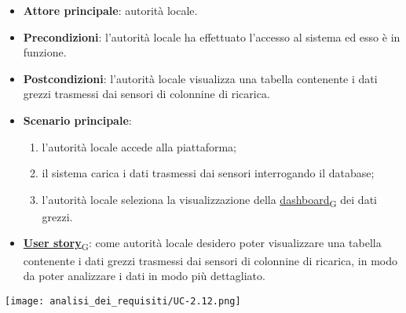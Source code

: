 \begin{itemize}
	\item \textbf{Attore principale}: autorità locale.
	\item \textbf{Precondizioni}: l'autorità locale ha effettuato l'accesso al sistema ed esso è in funzione.
	\item \textbf{Postcondizioni}: l'autorità locale visualizza una tabella contenente i dati grezzi trasmessi dai sensori di colonnine di ricarica.
	\item \textbf{Scenario principale}:
	      \begin{enumerate}
		      \item l'autorità locale accede alla piattaforma;
		      \item il sistema carica i dati trasmessi dai sensori interrogando il database;
		      \item l'autorità locale seleziona la visualizzazione della \href{https://7last.github.io/docs/rtb/documentazione-interna/glossario\#dashboard}{dashboard\textsubscript{G}} dei dati grezzi.
	      \end{enumerate}
	\item \href{https://7last.github.io/docs/rtb/documentazione-interna/glossario\#user-story}{\textbf{User story}\textsubscript{G}}:
	      come autorità locale desidero poter visualizzare una tabella contenente i dati grezzi trasmessi dai sensori di colonnine di ricarica,
	      in modo da poter analizzare i dati in modo più dettagliato.
\end{itemize}
\begin{center}
	\texttt{[image: analisi\_dei\_requisiti/UC-2.12.png]}
\end{center}

\newpage

